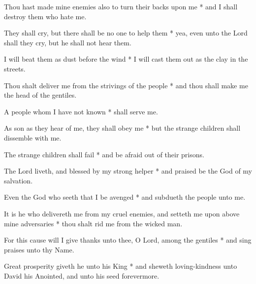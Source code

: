 Thou hast made mine enemies also to turn their backs upon me * and I shall destroy them who hate me.

They shall cry, but there shall be no one to help them * yea, even unto the Lord shall they cry, but he shall not hear them.

I will beat them as dust before the wind * I will cast them out as the clay in the streets.

Thou shalt deliver me from the strivings of the people * and thou shall make me the head of the gentiles.

A people whom I have not known * shall serve me.

As son as they hear of me, they shall obey me * but the strange children shall dissemble with me.

The strange children shall fail * and be afraid out of their prisons.

The Lord liveth, and blessed by my strong helper * and praised be the God of my salvation.

Even the God who seeth that I be avenged * and subdueth the people unto me.

It is he who delivereth me from my cruel enemies, and setteth me upon above mine adversaries * thou shalt rid me from the wicked man.

For this cause will I give thanks unto thee, O Lord, among the gentiles * and sing praises unto thy Name.

Great prosperity giveth he unto his King * and sheweth loving-kindness unto David his Anointed, and unto his seed forevermore.